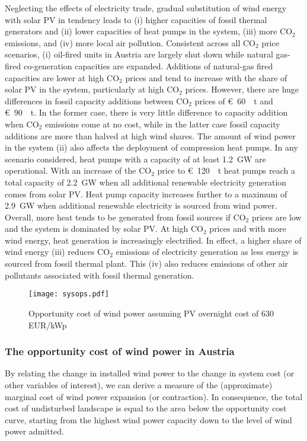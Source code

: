 \documentclass[review, 3p, times, 12pt]{elsarticle} %
\newcommand{\COO}{\ensuremath{\mathrm{CO_2}} }
\begin{document}
Neglecting the effects of electricity trade, gradual substitution of wind energy with solar PV in tendency leads to (i) higher capacities of fossil thermal
generators and (ii) lower capacities of heat pumps in the system, (iii) more \COO emissions, and (iv) more local
air pollution.
Consistent across all \COO price scenarios, (i) oil-fired units in Austria are largely shut down while natural gas-fired
co-generation capacities are expanded.
Additions of natural-gas fired capacities are lower at high \COO prices and tend to increase with the share of solar
PV in the system, particularly at high \COO prices.
However, there are huge differences in fossil capacity additions between \COO prices of \SI{60}[\euro]{\per\tonne}
and \SI{90}[\euro]{\per\tonne}.
In the former case, there is very little difference to capacity addition when \COO emissions come at no cost, while
in the latter case fossil capacity additions are more than halved at high wind shares.
The amount of wind power in the system (ii) also affects the deployment of compression heat pumps.
In any scenario considered, heat pumps with a capacity of at least \SI{1.2}{\giga\watt} are operational.
With an increase of the \COO price to \SI{120}[\euro]{\per\tonne} heat pumps reach a total capacity of
\SI{2.2}{\giga\watt} when all additional renewable electricity generation comes from solar PV\@.
Heat pump capacity increases further to a maximum of \SI{2.9}{\giga\watt} when additional renewable electricity is
sourced from wind power.
Overall, more heat tends to be generated from fossil sources if \COO prices are low and the system is dominated by
solar PV\@.
At high \COO prices and with more wind energy, heat generation is increasingly electrified.
In effect, a higher share of wind energy (iii) reduces \COO emissions of electricity generation as less energy is sourced from fossil thermal plant.
This (iv) also reduces emissions of other air pollutants associated with fossil thermal generation.

\begin{figure*}
\centering
\texttt{[image: sysops.pdf]}
\caption{Opportunity cost of wind power assuming PV overnight cost of 630 EUR/kWp}
\label{figure:system-operation-base}
\end{figure*}

\subsubsection{The opportunity cost of wind power in Austria}\label{subsec:opportunity-cost-wind}
By relating the change in installed wind power to the change in system cost (or other variables of interest), we
can derive a measure of the (approximate) marginal cost of wind power expansion (or contraction).
In consequence, the total cost of undisturbed landscape is equal to the area below the opportunity cost curve,
starting from the highest wind power capacity down to the level of wind power admitted.
\end{document}
